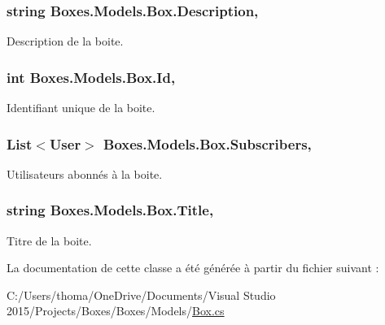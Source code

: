 \subsubsection[{\texorpdfstring{Description}{Description}}]{\setlength{\rightskip}{0pt plus 5cm}string Boxes.\+Models.\+Box.\+Description\hspace{0.3cm}{\ttfamily [get]}, {\ttfamily [set]}}\hypertarget{class_boxes_1_1_models_1_1_box_ab5b608a65148d5428899e34640e5fe75}{}\label{class_boxes_1_1_models_1_1_box_ab5b608a65148d5428899e34640e5fe75}


Description de la boite. 

\subsubsection[{\texorpdfstring{Id}{Id}}]{\setlength{\rightskip}{0pt plus 5cm}int Boxes.\+Models.\+Box.\+Id\hspace{0.3cm}{\ttfamily [get]}, {\ttfamily [set]}}\hypertarget{class_boxes_1_1_models_1_1_box_a6c7af8b2c2c4a76ea6af5f1235990d51}{}\label{class_boxes_1_1_models_1_1_box_a6c7af8b2c2c4a76ea6af5f1235990d51}


Identifiant unique de la boite. 

\subsubsection[{\texorpdfstring{Subscribers}{Subscribers}}]{\setlength{\rightskip}{0pt plus 5cm}List$<${\bf User}$>$ Boxes.\+Models.\+Box.\+Subscribers\hspace{0.3cm}{\ttfamily [get]}, {\ttfamily [set]}}\hypertarget{class_boxes_1_1_models_1_1_box_a0673e580220c22c6b95ca05b3a800a65}{}\label{class_boxes_1_1_models_1_1_box_a0673e580220c22c6b95ca05b3a800a65}


Utilisateurs abonnés à la boite. 

\subsubsection[{\texorpdfstring{Title}{Title}}]{\setlength{\rightskip}{0pt plus 5cm}string Boxes.\+Models.\+Box.\+Title\hspace{0.3cm}{\ttfamily [get]}, {\ttfamily [set]}}\hypertarget{class_boxes_1_1_models_1_1_box_a74ccb7023557088f761d035260bb66f5}{}\label{class_boxes_1_1_models_1_1_box_a74ccb7023557088f761d035260bb66f5}


Titre de la boite. 



La documentation de cette classe a été générée à partir du fichier suivant \+:\begin{DoxyCompactItemize}
\item 
C\+:/\+Users/thoma/\+One\+Drive/\+Documents/\+Visual Studio 2015/\+Projects/\+Boxes/\+Boxes/\+Models/\hyperlink{_box_8cs}{Box.\+cs}\end{DoxyCompactItemize}
